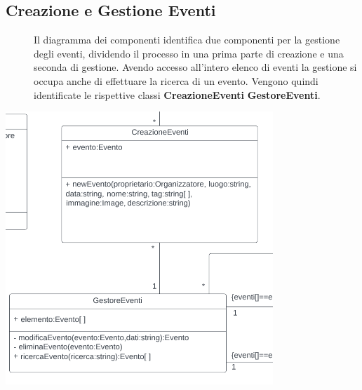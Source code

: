 \documentclass{article}
\begin{document}
\subsection{Creazione e Gestione Eventi}
\begin{description}
    \item[] Il diagramma dei componenti identifica due componenti per la gestione degli eventi, dividendo il processo in una prima parte di creazione e una seconda di gestione. Avendo accesso all'intero elenco di eventi la gestione si occupa anche di effettuare la ricerca di un evento. Vengono quindi identificate le rispettive classi \textbf{CreazioneEventi} \textbf{GestoreEventi}.
\end{description}
\begin{center}
    \item[] \includegraphics[scale=0.7]{gestoreEventi.png}
\end{center}
\end{document}
